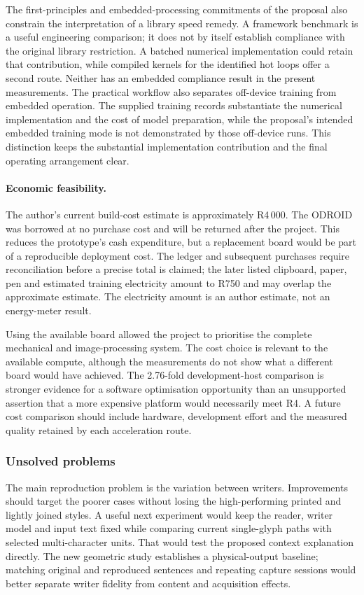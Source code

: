 The first-principles and embedded-processing commitments of the proposal also constrain the interpretation of a library speed remedy. A framework benchmark is a useful engineering comparison; it does not by itself establish compliance with the original library restriction. A batched numerical implementation could retain that contribution, while compiled kernels for the identified hot loops offer a second route. Neither has an embedded compliance result in the present measurements. The practical workflow also separates off-device training from embedded operation. The supplied training records substantiate the numerical implementation and the cost of model preparation, while the proposal's intended embedded training mode is not demonstrated by those off-device runs. This distinction keeps the substantial implementation contribution and the final operating arrangement clear.

\paragraph{Economic feasibility.}
The author's current build-cost estimate is approximately R4\,000. The ODROID was borrowed at no purchase cost and will be returned after the project. This reduces the prototype's cash expenditure, but a replacement board would be part of a reproducible deployment cost. The ledger and subsequent purchases require reconciliation before a precise total is claimed; the later listed clipboard, paper, pen and estimated training electricity amount to R750 and may overlap the approximate estimate. The electricity amount is an author estimate, not an energy-meter result.

Using the available board allowed the project to prioritise the complete mechanical and image-processing system. The cost choice is relevant to the available compute, although the measurements do not show what a different board would have achieved. The 2.76-fold development-host comparison is stronger evidence for a software optimisation opportunity than an unsupported assertion that a more expensive platform would necessarily meet R4. A future cost comparison should include hardware, development effort and the measured quality retained by each acceleration route.

\subsubsection{Unsolved problems}
\label{sec:dis-unsolved}
The main reproduction problem is the variation between writers. Improvements should target the poorer cases without losing the high-performing printed and lightly joined styles. A useful next experiment would keep the reader, writer model and input text fixed while comparing current single-glyph paths with selected multi-character units. That would test the proposed context explanation directly. The new geometric study establishes a physical-output baseline; matching original and reproduced sentences and repeating capture sessions would better separate writer fidelity from content and acquisition effects.

